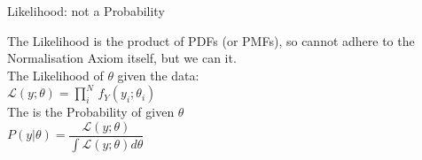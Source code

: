 \documentclass[10pt,sans,english,compress,table,xcolor=dvipsnames]{beamer}
\begin{document}
%
%
%
%
%
%


\begin{frame}{Likelihood: not a Probability}

The Likelihood is the product of PDFs (or PMFs), so cannot adhere to the Normalisation Axiom itself, but we can  it.\\[1ex]

The Likelihood of $\theta$ given the data:\\[1ex]

$\mathcal{L}(y;\theta) = \prod\limits_i^N\, f_Y(y_i;\theta_i) $\\[1ex]

The  is the Probability of  given $\theta$\\[1ex]

$P(y | \theta) = \dfrac{\mathcal{L}(y;\theta)}{\int \mathcal{L}(y;\theta) d\theta}$


\end{frame}
\end{document}
